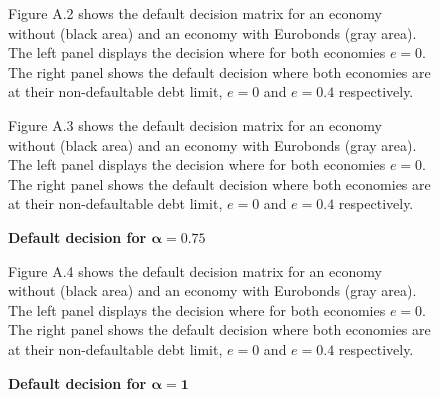 \begin{appendices}
\begin{figure}[H]
{    }
        \begin{tablenotes}
      \footnotesize
    Figure A.2 shows the default decision matrix for an economy without (black area) and an economy with Eurobonds (gray area). The left panel displays the decision where for both economies $e = 0$. The right panel shows the default decision where both economies are at their non-defaultable debt limit, $e = 0$ and $e = 0.4$ respectively.
    \end{tablenotes}
\end{figure}

\begin{figure}[H]
\caption{\textbf{Default decision for $\bm{\alpha = 0.75}$}}
    \centering
    \vspace{1mm}
        \begin{tablenotes}
      \footnotesize
    Figure A.3 shows the default decision matrix for an economy without (black area) and an economy with Eurobonds (gray area). The left panel displays the decision where for both economies $e = 0$. The right panel shows the default decision where both economies are at their non-defaultable debt limit, $e = 0$ and $e = 0.4$ respectively.
    \end{tablenotes}
\end{figure}

\begin{figure}[H]
\caption{\textbf{Default decision for $\bm{\alpha = 1}$}}
    \centering
    \vspace{1mm}
        \begin{tablenotes}
      \footnotesize
    Figure A.4 shows the default decision matrix for an economy without (black area) and an economy with Eurobonds (gray area). The left panel displays the decision where for both economies $e = 0$. The right panel shows the default decision where both economies are at their non-defaultable debt limit, $e = 0$ and $e = 0.4$ respectively.
    \end{tablenotes}
\end{figure}

\end{appendices}

